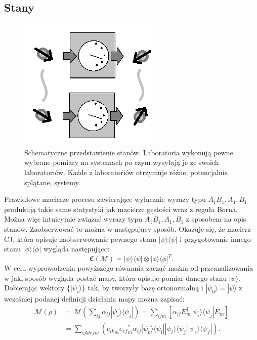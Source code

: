 \documentclass[10pt]{article} %
\newcommand{\Ket}[1]{|#1\rangle}
\newcommand{\Bra}[1]{\langle#1|}
\newcommand{\KP}{\Ket{\psi}}
\newcommand{\BP}{\Bra{\psi}}
\newcommand{\MCJ}{\mathfrak{C}}
\begin{document}
\subsection{Stany}
\begin{figure}[h]
\centering
\includegraphics{obrazki/states_new}
\caption{Schematyczne przedstawienie stanów. Laboratoria wykonują pewne wybrane pomiary na systemach po czym wysyłają je ze swoich laboratoriów. Każde z laboratoriów otrzymuje różne, potencjalnie splątane, systemy.}
\end{figure}
Prawidłowe macierze procesu zawierające wyłącznie wyrazy typu $A_1 B_1, A_1, B_1$ produkują takie same statystyki jak macierze gęstości wraz z reguła Borna. Można więc intuicyjnie związać wyrazy typu $A_1 B_1, A_1, B_1$ z sposobem na opis stanów. Zaobserwować to można w następujący sposób.
Okazuje się, że macierz CJ, która opisuje zaobserwowanie pewnego stanu $\KP\BP$ i przygotowanie innego stanu $\Ket{\phi}\Bra{\phi}$ wygląda następująco:
\begin{equation}
\MCJ(\mathcal{M}) = \KP\BP \otimes \Ket{\phi}\Bra{\phi}^T.
\end{equation}
W celu wyprowadzenia powyższego równania zacząć można od przeanalizowania w jaki sposób wygląda postać mapy, która opisuje pomiar danego stanu $\Ket{\psi}$. Dobierając wektory $\{ \Ket{\psi_i} \}$ tak, by tworzyły bazę ortonormalną i $\Ket{\psi_0} = \Ket{\psi}$ z wcześniej podanej definicji działania mapy można zapisać:
\begin{equation}
\begin{split}
\mathcal{M}(\rho) &= \mathcal{M}\left(\sum_{ij} \alpha_{ij} \Ket{\psi_i}\Bra{\psi_j}\right) = \sum_{ijm} \left[ \alpha_{ij} E^\dag_m \Ket{\psi_i}\Bra{\psi_j}E_m\right]\\
&= \sum_{ijklefm} \left( {e_{lk}}_m {e_{ef}}_m^*\alpha_{ij} \Ket{\psi_k}\Bra{\psi_l} \Ket{\psi_i}\Bra{\psi_j} \Ket{\psi_e}\Bra{\psi_f}\right). 
\end{split}
\end{equation}
\end{document}
